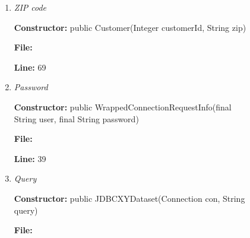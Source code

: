 \begin{figure}

\begin{enumerate}
\item \textit{ZIP code}

\textbf{Constructor:} public Customer(Integer customerId, String zip)

\textbf{File:} 

\textbf{Line:} 69

\vspace{6px}

%
%
%


\item \textit{Password}

%
%
%

\textbf{Constructor:} public WrappedConnectionRequestInfo(final String user, final String password)

\textbf{File:} 

\textbf{Line:} 39

\vspace{6px}


\item \textit{Query}

%
%
%

\textbf{Constructor:} public JDBCXYDataset(Connection con, String query)

\textbf{File:} 


\end{enumerate}
\end{figure}
